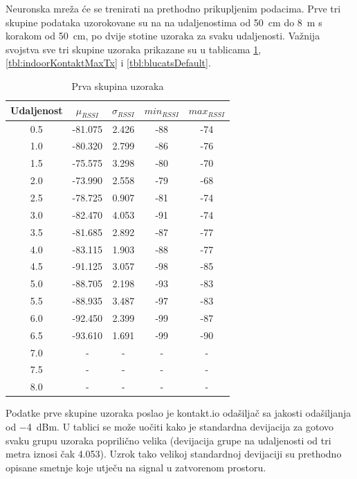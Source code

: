 Neuronska mreža će se trenirati na prethodno prikupljenim podacima. 
Prve tri skupine podataka uzorokovane su na na udaljenostima od \SI{50}{cm} do \SI{8}{m} s korakom od \SI{50}{cm}, po dvije stotine uzoraka za svaku udaljenosti. 
Važnija svojstva sve tri skupine uzoraka prikazane su u tablicama \ref{tbl:indoorKontaktDefaultTx}, \ref{tbl:indoorKontaktMaxTx} i \ref{tbl:blucatsDefault}.

\begin{table}[H]
	\centering
	\caption{Prva skupina uzoraka}
	\label{tbl:indoorKontaktDefaultTx}
	\begin{tabular}{ccccc}
	\hline
	Udaljenost & $\mu_{RSSI}$ & $\sigma_{RSSI}$ & $min_{RSSI}$ & $max_{RSSI}$ \\
	\hline
	0.5 & -81.075 & 2.426 & -88 & -74 \\
	1.0 & -80.320 & 2.799 & -86 & -76 \\
	1.5 & -75.575 & 3.298 & -80 & -70 \\
	2.0 & -73.990 & 2.558 & -79 & -68 \\
	2.5 & -78.725 & 0.907 & -81 & -74 \\
	3.0 & -82.470 & 4.053 & -91 & -74 \\
	3.5 & -81.685 & 2.892 & -87 & -77 \\
	4.0 & -83.115 & 1.903 & -88 & -77 \\
	4.5 & -91.125 & 3.057 & -98 & -85 \\
	5.0 & -88.705 & 2.198 & -93 & -83 \\
	5.5 & -88.935 & 3.487 & -97 & -83 \\
	6.0 & -92.450 & 2.399 & -99 & -87 \\
	6.5 & -93.610 & 1.691 & -99 & -90 \\
	7.0 & - & - & - & - \\
	7.5 & - & - & - & - \\
	8.0 & - & - & - & - \\
	\hline
	\end{tabular}
\end{table}

Podatke prve skupine uzoraka poslao je kontakt.io odašiljač sa jakosti odašiljanja od \SI{-4}{dBm}. 
U tablici se može uočiti kako je standardna devijacija za gotovo svaku grupu uzoraka poprilično velika (devijacija grupe na udaljenosti od tri metra iznosi čak 4.053). 
Uzrok tako velikoj standardnoj devijaciji su prethodno opisane smetnje koje utječu na signal u zatvorenom prostoru.

